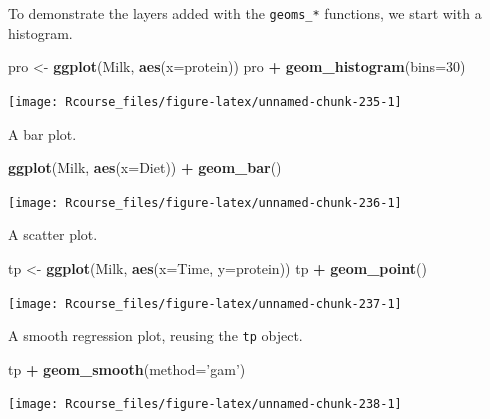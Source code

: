 \documentclass[]{book}
\newenvironment{Shaded}{\begin{snugshade}}{\end{snugshade}}
\newcommand{\KeywordTok}[1]{\textcolor[rgb]{0.13,0.29,0.53}{\textbf{#1}}}
\newcommand{\DataTypeTok}[1]{\textcolor[rgb]{0.13,0.29,0.53}{#1}}
\newcommand{\DecValTok}[1]{\textcolor[rgb]{0.00,0.00,0.81}{#1}}
\newcommand{\StringTok}[1]{\textcolor[rgb]{0.31,0.60,0.02}{#1}}
\newcommand{\OperatorTok}[1]{\textcolor[rgb]{0.81,0.36,0.00}{\textbf{#1}}}
\newcommand{\NormalTok}[1]{#1}
\theoremstyle{definition}
\theoremstyle{definition}
\theoremstyle{definition}
\theoremstyle{remark}
\begin{document}
To demonstrate the layers added with the \texttt{geoms\_*} functions, we
start with a histogram.

\begin{Shaded}
\begin{Highlighting}[]
\NormalTok{pro <-}\StringTok{ }\KeywordTok{ggplot}\NormalTok{(Milk, }\KeywordTok{aes}\NormalTok{(}\DataTypeTok{x=}\NormalTok{protein))}
\NormalTok{pro }\OperatorTok{+}\StringTok{ }\KeywordTok{geom_histogram}\NormalTok{(}\DataTypeTok{bins=}\DecValTok{30}\NormalTok{)}
\end{Highlighting}
\end{Shaded}

\texttt{[image: Rcourse\_files/figure-latex/unnamed-chunk-235-1]}

A bar plot.

\begin{Shaded}
\begin{Highlighting}[]
\KeywordTok{ggplot}\NormalTok{(Milk, }\KeywordTok{aes}\NormalTok{(}\DataTypeTok{x=}\NormalTok{Diet)) }\OperatorTok{+}
\StringTok{  }\KeywordTok{geom_bar}\NormalTok{()}
\end{Highlighting}
\end{Shaded}

\texttt{[image: Rcourse\_files/figure-latex/unnamed-chunk-236-1]}

A scatter plot.

\begin{Shaded}
\begin{Highlighting}[]
\NormalTok{tp <-}\StringTok{ }\KeywordTok{ggplot}\NormalTok{(Milk, }\KeywordTok{aes}\NormalTok{(}\DataTypeTok{x=}\NormalTok{Time, }\DataTypeTok{y=}\NormalTok{protein))}
\NormalTok{tp }\OperatorTok{+}\StringTok{ }\KeywordTok{geom_point}\NormalTok{()}
\end{Highlighting}
\end{Shaded}

\texttt{[image: Rcourse\_files/figure-latex/unnamed-chunk-237-1]}

A smooth regression plot, reusing the \texttt{tp} object.

\begin{Shaded}
\begin{Highlighting}[]
\NormalTok{tp }\OperatorTok{+}\StringTok{ }\KeywordTok{geom_smooth}\NormalTok{(}\DataTypeTok{method=}\StringTok{'gam'}\NormalTok{)}
\end{Highlighting}
\end{Shaded}

\texttt{[image: Rcourse\_files/figure-latex/unnamed-chunk-238-1]}
\end{document}
